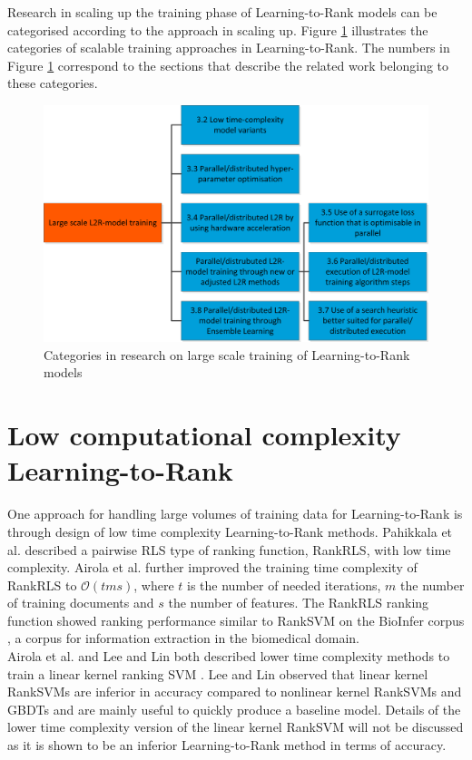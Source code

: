 Research in scaling up the training phase of Learning-to-Rank models can be categorised according to the approach in scaling up. Figure \ref{fig:related_work_categories} illustrates the categories of scalable training approaches in Learning-to-Rank. The numbers in Figure \ref{fig:related_work_categories} correspond to the sections that describe the related work belonging to these categories.

\begin{figure}
\includegraphics{gfx/related_work_categories}
\caption{Categories in research on large scale training of  Learning-to-Rank models}
\label{fig:related_work_categories}
\end{figure}

\section{Low computational complexity Learning-to-Rank}
\label{sec:related_work_low_complexity}
One approach for handling large volumes of training data for Learning-to-Rank is through design of low time complexity Learning-to-Rank methods. Pahikkala et al. \cite{Pahikkala2009} described a pairwise \ac{RLS} type of ranking function, RankRLS, with low time complexity. Airola et al. \cite{Airola2010} further improved the training time complexity of RankRLS to $\mathcal{O}(tms)$, where $t$ is the number of needed iterations, $m$ the number of training documents and $s$ the number of features. The RankRLS ranking function showed ranking performance similar to Rank\acs{SVM} \cite{Herbrich1999, Joachims2002} on the BioInfer corpus \cite{Pyysalo2007}, a corpus for information extraction in the biomedical domain.\\

Airola et al. \cite{Airola2011} and Lee and Lin \cite{Lee2014} both described lower time complexity methods to train a linear kernel ranking \ac{SVM} \cite{Herbrich1999, Joachims2002}. Lee and Lin \cite{Lee2014} observed that linear kernel Rank\ac{SVM}s are inferior in accuracy compared to nonlinear kernel Rank\ac{SVM}s and \ac{GBDT}s and are mainly useful to quickly produce a baseline model. Details of the lower time complexity version of the linear kernel Rank\ac{SVM} will not be discussed as it is shown to be an inferior Learning-to-Rank method in terms of accuracy.\\

